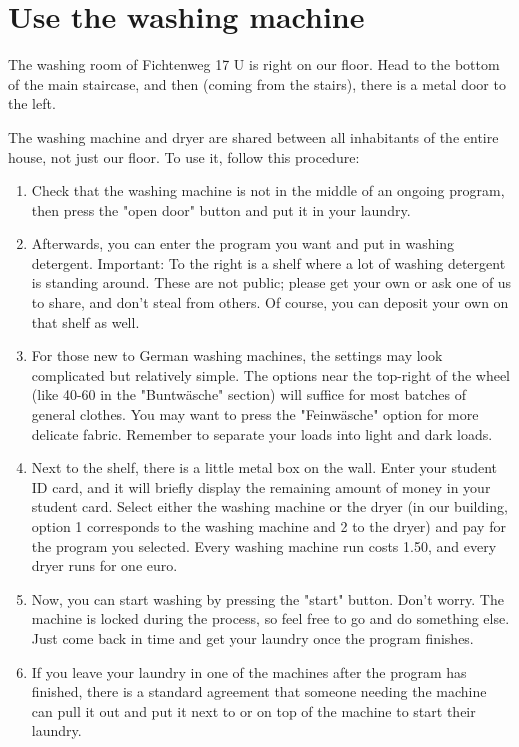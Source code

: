 \section{Use the washing machine} \label{sec:qna-washing-machine}
The washing room of Fichtenweg 17 U is right on our floor. Head to the bottom of the main staircase, and then (coming from the stairs), there is a metal door to the left.

The washing machine and dryer are shared between all inhabitants of the entire house, not just our floor. To use it, follow this procedure:
\begin{enumerate}
    \item Check that the washing machine is not in the middle of an ongoing program, then press the "open door" button and put it in your laundry.

    \item Afterwards, you can enter the program you want and put in washing detergent. Important: To the right is a shelf where a lot of washing detergent is standing around. These are not public; please get your own or ask one of us to share, and don't steal from others. Of course, you can deposit your own on that shelf as well.

    \item For those new to German washing machines, the settings may look complicated but relatively simple. The options near the top-right of the wheel (like 40-60 in the "Buntwäsche" section) will suffice for most batches of general clothes. You may want to press the "Feinwäsche" option for more delicate fabric. Remember to separate your loads into light and dark loads.

    \item Next to the shelf, there is a little metal box on the wall. Enter your student ID card, and it will briefly display the remaining amount of money in your student card. Select either the washing machine or the dryer (in our building, option 1 corresponds to the washing machine and 2 to the dryer) and pay for the program you selected. Every washing machine run costs 1.50, and every dryer runs for one euro.

    \item Now, you can start washing by pressing the "start" button. Don't worry. The machine is locked during the process, so feel free to go and do something else. Just come back in time and get your laundry once the program finishes.

    \item If you leave your laundry in one of the machines after the program has finished, there is a standard agreement that someone needing the machine can pull it out and put it next to or on top of the machine to start their laundry.


\end{enumerate}
